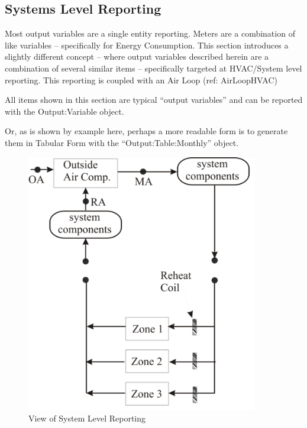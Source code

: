 \subsection{Systems Level Reporting}\label{systems-level-reporting}

Most output variables are a single entity reporting. Meters are a combination of like variables -- specifically for Energy Consumption. This section introduces a slightly different concept -- where output variables described herein are a combination of several similar items -- specifically targeted at HVAC/System level reporting. This reporting is coupled with an Air Loop (ref: AirLoopHVAC)

All items shown in this section are typical ``output variables'' and can be reported with the Output:Variable object.

Or, as is shown by example here, perhaps a more readable form is to generate them in Tabular Form with the ``Output:Table:Monthly'' object.

\begin{figure}[hbtp] %
\centering
\includegraphics[width=0.9\textwidth, height=0.9\textheight, keepaspectratio=true]{media/image213.png}
\caption{View of System Level Reporting \protect \label{fig:view-of-system-level-reporting}}
\end{figure}

